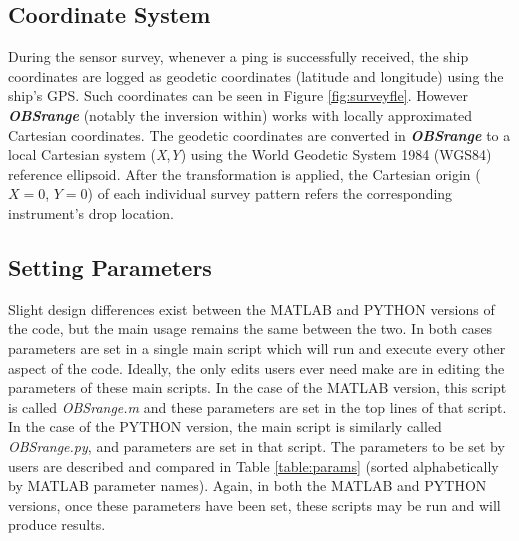 \documentclass[titlepage, 12pt]{article}
\begin{document}
  \subsection{Coordinate System}
  During the sensor survey, whenever a ping is successfully received, the ship coordinates are logged as geodetic coordinates (latitude and longitude) using the ship's GPS. Such coordinates can be seen in Figure \ref{fig:surveyfle}. However \textit{\textbf{OBSrange}} (notably the inversion within) works with locally approximated Cartesian coordinates. The geodetic coordinates are converted in \textit{\textbf{OBSrange}} to a local Cartesian system (\textit{X},\textit{Y}) using the World Geodetic System 1984 (WGS84) reference ellipsoid. After the transformation is applied, the Cartesian origin ($X=0$, $Y=0$) of each individual survey pattern refers the corresponding instrument's drop location. 
  
  \subsection{Setting Parameters}
  \label{section:params}
  Slight design differences exist between the MATLAB and PYTHON versions of the code, but the main usage remains the same between the two. In both cases parameters are set in a single main script which will run and execute every other aspect of the code. Ideally, the only edits users ever need make are in editing the parameters of these main scripts. In the case of the MATLAB version, this script is called \textit{OBSrange.m} and these parameters are set in the top lines of that script. In the case of the PYTHON version, the main script is similarly called \textit{OBSrange.py}, and parameters are set in that script. The parameters to be set by users are described and compared in Table \ref{table:params} (sorted alphabetically by MATLAB parameter names).  Again, in both the MATLAB and PYTHON versions, once these parameters have been set, these scripts may be run and will produce results. 
\end{document}
